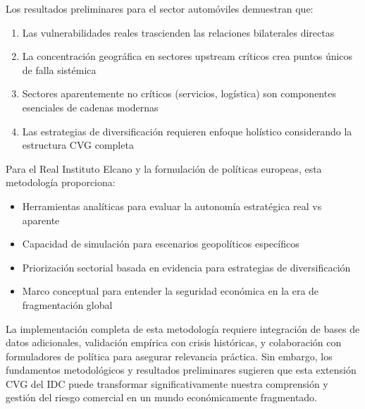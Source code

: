 \documentclass[12pt,a4paper]{article}
\begin{document}
Los resultados preliminares para el sector automóviles demuestran que:
\begin{enumerate}
    \item Las vulnerabilidades reales trascienden las relaciones bilaterales directas
    \item La concentración geográfica en sectores upstream críticos crea puntos únicos de falla sistémica
    \item Sectores aparentemente no críticos (servicios, logística) son componentes esenciales de cadenas modernas
    \item Las estrategias de diversificación requieren enfoque holístico considerando la estructura CVG completa
\end{enumerate}

Para el Real Instituto Elcano y la formulación de políticas europeas, esta metodología proporciona:
\begin{itemize}
    \item Herramientas analíticas para evaluar la autonomía estratégica real vs aparente
    \item Capacidad de simulación para escenarios geopolíticos específicos
    \item Priorización sectorial basada en evidencia para estrategias de diversificación
    \item Marco conceptual para entender la seguridad económica en la era de fragmentación global
\end{itemize}

La implementación completa de esta metodología requiere integración de bases de datos adicionales, validación empírica con crisis históricas, y colaboración con formuladores de política para asegurar relevancia práctica. Sin embargo, los fundamentos metodológicos y resultados preliminares sugieren que esta extensión CVG del IDC puede transformar significativamente nuestra comprensión y gestión del riesgo comercial en un mundo económicamente fragmentado.



\end{document}
